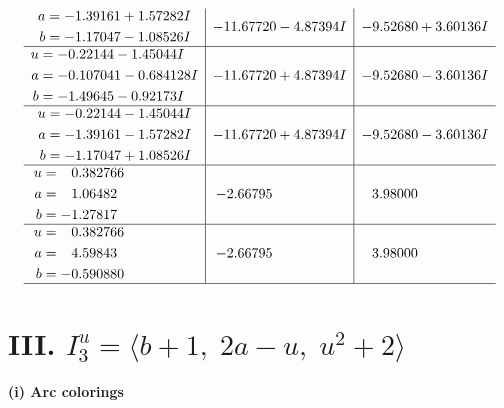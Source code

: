 \documentclass[1p]{elsarticle_modified}
\theoremstyle{definition}
\begin{document}
$$\begin{array}{c|c|c}
\begin{aligned}
a &= -1.39161 + 1.57282 I \\
b &= -1.17047 - 1.08526 I\end{aligned}
 & -11.67720 - 4.87394 I & -9.52680 + 3.60136 I \\ \hline\begin{aligned}
u &= -0.22144 - 1.45044 I \\
a &= -0.107041 - 0.684128 I \\
b &= -1.49645 - 0.92173 I\end{aligned}
 & -11.67720 + 4.87394 I & -9.52680 - 3.60136 I \\ \hline\begin{aligned}
u &= -0.22144 - 1.45044 I \\
a &= -1.39161 - 1.57282 I \\
b &= -1.17047 + 1.08526 I\end{aligned}
 & -11.67720 + 4.87394 I & -9.52680 - 3.60136 I \\ \hline\begin{aligned}
u &= \phantom{-}0.382766\phantom{ +0.000000I} \\
a &= \phantom{-}1.06482\phantom{ +0.000000I} \\
b &= -1.27817\phantom{ +0.000000I}\end{aligned}
 & -2.66795\phantom{ +0.000000I} & \phantom{-}3.98000\phantom{ +0.000000I} \\ \hline\begin{aligned}
u &= \phantom{-}0.382766\phantom{ +0.000000I} \\
a &= \phantom{-}4.59843\phantom{ +0.000000I} \\
b &= -0.590880\phantom{ +0.000000I}\end{aligned}
 & -2.66795\phantom{ +0.000000I} & \phantom{-}3.98000\phantom{ +0.000000I}\\
 \hline 
 \end{array}$$\newpage\newpage\renewcommand{\arraystretch}{1}
\centering \section*{III. $I^u_{3}= \langle b+1,\;2 a- u,\;u^2+2 \rangle$}
\flushleft \textbf{(i) Arc colorings}\\
\end{document}

